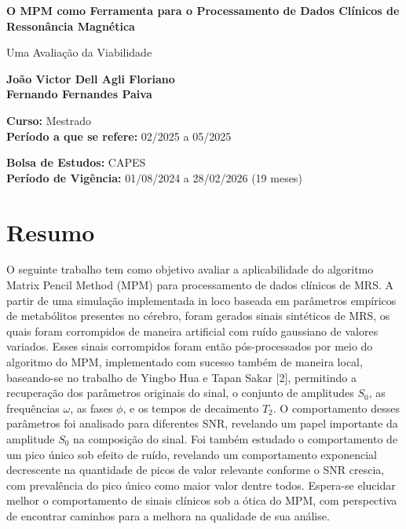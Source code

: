 \documentclass[12pt]{article}
\begin{document}
\begin{titlepage}
    \begin{center}
        \vspace*{1cm}
            
        \Huge
        \textbf{O MPM como Ferramenta para o Processamento de Dados Clínicos de Ressonância Magnética}
            
        \vspace{0.5cm}
        \LARGE
        Uma Avaliação da Viabilidade
            
        \vspace{1.5cm}
            
        \textbf{João Victor Dell Agli Floriano \\ Fernando Fernandes Paiva}

            
        \vfill
            
        \textbf{Curso:} Mestrado \\
        \textbf{Período a que se refere:} 02/2025 a 05/2025
            
        \vspace{0.8cm}
            
        \Large
        \textbf{Bolsa de Estudos:} CAPES \\
        \textbf{Período de Vigência:} 01/08/2024 a 28/02/2026 (19 meses)
            
    \end{center}
\end{titlepage}


\section{Resumo}

O seguinte trabalho tem como objetivo avaliar a aplicabilidade do algoritmo Matrix Pencil Method (MPM) para processamento de dados clínicos de MRS. A partir de 
uma simulação implementada in loco baseada em parâmetros empíricos de metabólitos presentes no cérebro, foram gerados sinais sintéticos de MRS, os quais 
foram corrompidos de maneira artificial com ruído gaussiano de valores variados. Esses sinais corrompidos foram então pós-processados por meio do algoritmo do MPM, 
implementado com sucesso também de maneira local, baseando-se no trabalho de Yingbo Hua e Tapan Sakar [2], permitindo a recuperação dos parâmetros originais do 
sinal, o conjunto de amplitudes $S_0$, as frequências $\omega$, as fases $\phi$, e os tempos de decaimento $T_2$. O comportamento desses parâmetros foi analisado para 
diferentes SNR, revelando um papel importante da amplitude $S_0$ na composição do sinal. Foi também estudado o comportamento de um pico único sob efeito de ruído, 
revelando um comportamento exponencial decrescente na quantidade de picos de valor relevante conforme o SNR crescia, com prevalência do pico único como maior valor 
dentre todos. Espera-se elucidar melhor o comportamento de sinais clínicos sob a ótica do MPM, com perspectiva de encontrar caminhos para a melhora na qualidade de sua análise.
\end{document}
